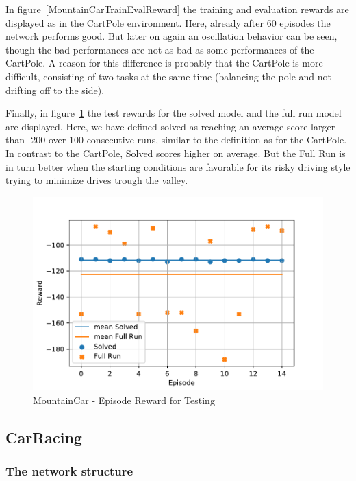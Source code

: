 \documentclass[
        a4paper,
        10pt,
        parskip = full,    %
    ]{scrartcl}
\begin{document}
In figure~\ref{MountainCarTrainEvalReward} the training and evaluation rewards
are displayed as in the CartPole environment. Here, already after 60
episodes the network performs good. But later on again an oscillation behavior
can be seen, though the bad performances are not as bad
as some performances of the CartPole. A reason for this difference is probably
that the CartPole is more difficult, consisting of two tasks at the same time
(balancing the pole and not drifting off to the side).

Finally, in figure~\ref{MountainCarTestReward} the test rewards for the
solved model and the full run model are displayed. Here, we have defined solved
as reaching an average score larger than -200 over 100 consecutive runs,
similar to the definition as for the CartPole. In contrast to the CartPole,
Solved scores higher on average. But the Full Run is in turn better when
the starting conditions are favorable for its risky driving style trying to
minimize drives trough the valley.

\begin{figure}[H]
  \begin{center}
    \includegraphics{./images/MountainCar-v0/tb_test_reward.pdf}
    \caption{MountainCar - Episode Reward for Testing}
    \label{MountainCarTestReward}
  \end{center}
\end{figure}


\subsection{CarRacing}

\subsubsection{The network structure}
\end{document}
